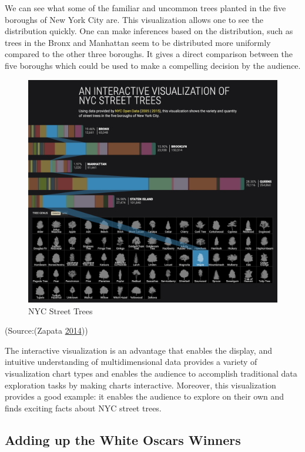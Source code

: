 \documentclass[]{book}
\begin{document}
We can see what some of the familiar and uncommon trees planted in the five boroughs of New York City are. This visualization allows one to see the distribution quickly. One can make inferences based on the distribution, such as trees in the Bronx and Manhattan seem to be distributed more uniformly compared to the other three boroughs. It gives a direct comparison between the five boroughs which could be used to make a compelling decision by the audience.

\begin{figure}
\centering
\includegraphics{images/NY_trees.png}
\caption{NYC Street Trees}
\end{figure}

(Source:(Zapata \protect\hyperlink{ref-trees}{2014}))

The interactive visualization is an advantage that enables the display, and intuitive understanding of multidimensional data provides a variety of visualization chart types and enables the audience to accomplish traditional data exploration tasks by making charts interactive. Moreover, this visualization provides a good example: it enables the audience to explore on their own and finds exciting facts about NYC street trees.

\hypertarget{adding-up-the-white-oscars-winners}{%
\subsection{Adding up the White Oscars Winners}\label{adding-up-the-white-oscars-winners}}
\end{document}
